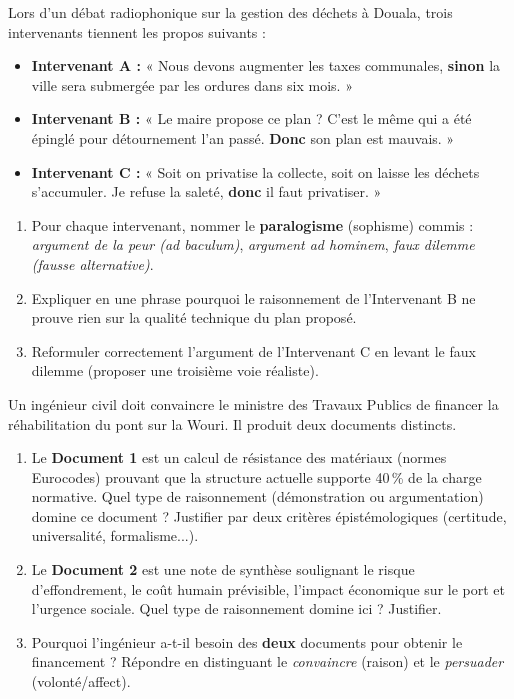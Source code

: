 \documentclass[11pt]{article}
\begin{document}
\begin{exercice}
Lors d'un débat radiophonique sur la gestion des déchets à Douala, trois intervenants tiennent les propos suivants :
\begin{itemize}
    \item \textbf{Intervenant A :} « Nous devons augmenter les taxes communales, \textbf{sinon} la ville sera submergée par les ordures dans six mois. »
    \item \textbf{Intervenant B :} « Le maire propose ce plan ? C'est le même qui a été épinglé pour détournement l'an passé. \textbf{Donc} son plan est mauvais. »
    \item \textbf{Intervenant C :} « Soit on privatise la collecte, soit on laisse les déchets s'accumuler. Je refuse la saleté, \textbf{donc} il faut privatiser. »
\end{itemize}
\begin{enumerate}
    \item Pour chaque intervenant, nommer le \textbf{paralogisme} (sophisme) commis : \textit{argument de la peur (ad baculum)}, \textit{argument ad hominem}, \textit{faux dilemme (fausse alternative)}.
    \item Expliquer en une phrase pourquoi le raisonnement de l'Intervenant B ne prouve rien sur la qualité technique du plan proposé.
    \item Reformuler correctement l'argument de l'Intervenant C en levant le faux dilemme (proposer une troisième voie réaliste).
\end{enumerate}
\end{exercice}

\begin{exercice}
Un ingénieur civil doit convaincre le ministre des Travaux Publics de financer la réhabilitation du pont sur la Wouri. Il produit deux documents distincts.
\begin{enumerate}
    \item Le \textbf{Document 1} est un calcul de résistance des matériaux (normes Eurocodes) prouvant que la structure actuelle supporte 40\,\% de la charge normative. Quel type de raisonnement (démonstration ou argumentation) domine ce document ? Justifier par deux critères épistémologiques (certitude, universalité, formalisme...).
    \item Le \textbf{Document 2} est une note de synthèse soulignant le risque d'effondrement, le coût humain prévisible, l'impact économique sur le port et l'urgence sociale. Quel type de raisonnement domine ici ? Justifier.
    \item Pourquoi l'ingénieur a-t-il besoin des \textbf{deux} documents pour obtenir le financement ? Répondre en distinguant le \textit{convaincre} (raison) et le \textit{persuader} (volonté/affect).
\end{enumerate}
\end{exercice}
\end{document}

